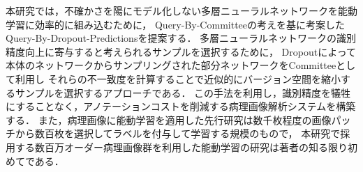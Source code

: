 本研究では，不確かさを陽にモデル化しない多層ニューラルネットワークを能動学習に効率的に組み込むために，
Query-By-Committeeの考えを基に考案したQuery-By-Dropout-Predictionsを提案する．
多層ニューラルネットワークの識別精度向上に寄与すると考えられるサンプルを選択するために，
Dropoutによって本体のネットワークからサンプリングされた部分ネットワークをCommitteeとして利用し
それらの不一致度を計算することで近似的にバージョン空間を縮小するサンプルを選択するアプローチである．
この手法を利用し，識別精度を犠牲にすることなく，アノテーションコストを削減する病理画像解析システムを構築する．
また，病理画像に能動学習を適用した先行研究は数千枚程度の画像パッチから数百枚を選択してラベルを付与して学習する規模のもので，
本研究で採用する数百万オーダー病理画像群を利用した能動学習の研究は著者の知る限り初めてである．

